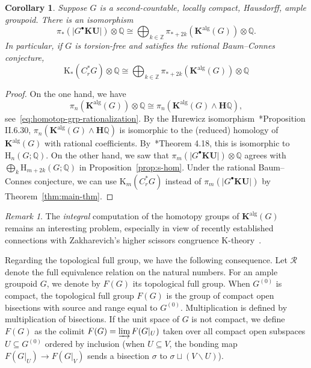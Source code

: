 \documentclass[a4paper,reqno]{amsart}
\theoremstyle{plain}
\newtheorem{corollary}[theorem]{Corollary}
\theoremstyle{definition}
\theoremstyle{remark}
\newtheorem{remark}[theorem]{Remark}
\numberwithin{equation}{section}
\newcommand{\rH}{\mathrm{H}}
\newcommand{\rK}{\mathrm{K}}
\newcommand{\dQ}{\mathbb{Q}}
\newcommand{\dZ}{\mathbb{Z}}
\newcommand{\bH}{\mathbf{H}}
\newcommand{\bK}{\mathbf{K}}
\newcommand{\gr}[1]{\lvert #1\rvert}
\newcommand{\KU}{\mathbf{KU}}
\begin{document}
\begin{corollary}\label{cor:ktop-kalg}
Suppose $G$ is a second-countable, locally compact, Hausdorff, ample groupoid. There is an isomorphism
      \[
      \pi_*(\gr{G^\bullet \KU})\otimes \dQ \cong  \bigoplus_{k\in \dZ}\pi_{*+2k} (\bK^{\mathrm{alg}}(G))\otimes \dQ.
      \]
In particular, if $G$ is torsion-free and satisfies the rational Baum--Connes conjecture, 
\[
\rK_*(C^*_r G) \otimes \dQ \cong  \bigoplus_{k\in \dZ}\pi_{*+2k} (\bK^{\mathrm{alg}}(G))\otimes \dQ
\]
\end{corollary}

\begin{proof}
On the one hand, we have
\[
\pi_{n} (\bK^{\mathrm{alg}}(G))\otimes \dQ \cong \pi_n(\bK^{\mathrm{alg}}(G) \wedge \bH \dQ),
\]
see~\eqref{eq:homotop-grp-rationalization}.
By the Hurewicz isomorphism~\cite{schede-book-draft-symm-spec}*{Proposition II.6.30}, $\pi_n(\bK^{\mathrm{alg}}(G) \wedge \bH \dQ)$ is isomorphic to the (reduced) homology of $\bK^{\mathrm{alg}}(G)$ with rational coefficients.
By~\cite{li:algk}*{Theorem 4.18}, this is isomorphic to $\rH_n(G; \dQ)$.
On the other hand, we saw that $\pi_m(\gr{G^\bullet \KU})\otimes \dQ$ agrees with $\bigoplus_k \rH_{m + 2k}(G; \dQ)$ in Proposition~\ref{prop:s-hom}.
Under the rational Baum--Connes conjecture, we can use $\rK_m(C^*_r G)$ instead of $\pi_m(\gr{G^\bullet \KU})$ by Theorem~\ref{thm:main-thm}. 
\end{proof}

\begin{remark}
The \emph{integral} computation of the homotopy groups of $\bK^{\mathrm{alg}}(G)$ remains an interesting problem, especially in view of recently established connections with Zakharevich's higher scissors congruence $\rK$-theory~\cites{klmms:scissors,zach:assk}.
\end{remark}

Regarding the topological full group, we have the following consequence. Let $\mathcal{R}$ denote the full equivalence relation on the natural numbers. For an ample groupoid $G$, we denote by $F(G)$ its topological full group. When $G^{(0)}$ is compact, the topological full group $F(G)$ is the group of compact open bisections with source and range equal to $G^{(0)}$. Multiplication is defined by multiplication of
bisections. If the unit space of $G$ is not compact, we define $F(G)$ as the colimit $F(G)=\varinjlim F(G|_U)$ taken over all compact open subspaces $U\subseteq G^{(0)}$ ordered by inclusion (when $U\subseteq V$, the bonding map $F(G|_U)\to F(G|_V)$ sends a bisection $\sigma$ to $\sigma \sqcup (V\smallsetminus U)$).
\end{document}
